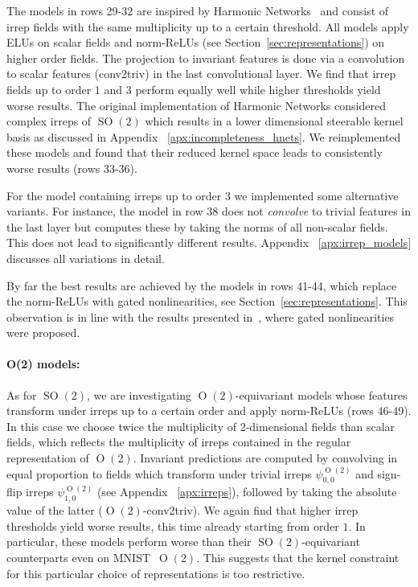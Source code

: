 \documentclass{article}
\newcommand{\apx}{Appendix\xspace
}
\renewcommand{\O}[1]{\ensuremath{\operatorname{O}(#1)}}
\newcommand{\SO}[1]{\ensuremath{\operatorname{SO}(#1)}}
\begin{document}
\begin{minipage}{\linewidth}
The models in rows 29-32 are inspired by Harmonic Networks~\cite{Worrall2017-HNET} and consist of irrep fields with the same multiplicity up to a certain threshold.
All models apply ELUs on scalar fields and norm-ReLUs (see Section~\ref{sec:representations}) on higher order fields.
The projection to invariant features is done via a convolution to scalar features (conv2triv) in the last convolutional layer.
We find that irrep fields up to order $1$ and $3$ perform equally well while higher thresholds yield worse results.
The original implementation of Harmonic Networks considered complex irreps of $\SO2$ which results in a lower dimensional steerable kernel basis as discussed in \apx~\ref{apx:incompleteness_hnets}.
We reimplemented these models and found that their reduced kernel space leads to consistently worse results (rows 33-36).
\end{minipage}

For the model containing irreps up to order $3$ we implemented some alternative variants.
For instance, the model in row 38 does not \textit{convolve} to trivial features in the last layer but computes these by taking the norms of all non-scalar fields.
This does not lead to significantly different results.
\apx~\ref{apx:irrep_models} discusses all variations in detail.

By far the best results are achieved by the models in rows 41-44, which replace the norm-ReLUs with gated nonlinearities, see Section~\ref{sec:representations}.
This observation is in line with the results presented in~\cite{3d_steerableCNNs}, where gated nonlinearities were proposed.




\paragraph{O(2) models:}
As for $\SO2$, we are investigating $\O2$-equivariant models whose features transform under irreps up to a certain order and apply norm-ReLUs (rows 46-49).
In this case we choose twice the multiplicity of 2-dimensional fields than scalar fields, which reflects the multiplicity of irreps contained in the regular representation of $\O2$.
Invariant predictions are computed by convolving in equal proportion to fields which transform under trivial irreps $\psi_{0,0}^{\O2}$ and sign-flip irreps $\psi_{1,0}^{\O2}$ (see \apx~\ref{apx:irreps}), followed by taking the absolute value of the latter ($\O2$-conv2triv).
We again find that higher irrep thresholds yield worse results, this time already starting from order $1$.
In particular, these models perform worse than their $\SO2$-equivariant counterparts even on MNIST~$\O2$.
This suggests that the kernel constraint for this particular choice of representations is too restrictive.
\end{document}
